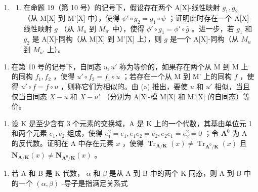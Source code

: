 \begin{enumerate}
\def\labelenumi{\arabic{enumi}.}
\setcounter{enumi}{25}
\tightlist
\item
  \begin{enumerate}
  \def\labelenumii{(\alph{enumii})}
  \tightlist
  \item
    在命题 19（第 10 号）的记号下，假设存在两个 A{[}X{]}-线性映射 \(g_1, g_2\) （从 M{[}X{]} 到 M'{[}X{]} 中），使得 \(\psi' \circ g_2 = g_1 \circ \psi\) ；证明此时存在一个 A{[}X{]}-线性映射 \(g\) （从 \(M_u\) 到 \(M_{u'}\) 中），使得 \(\phi' \circ g_1 = \phi' \circ \bar{g}\) 。进一步，若 \(g_1\) 和 \(g_2\) 是 A{[}X{]}-同构（从 M{[}X{]} 到 M'{[}X{]} 上），则 \(g\) 是一个 A{[}X{]}-同构（从 \(M_u\) 到 \(M_{u'}\) 上）。
  \end{enumerate}
\end{enumerate}

\begin{enumerate}
\def\labelenumi{(\alph{enumi})}
\setcounter{enumi}{1}
\tightlist
\item
  在第 10 号的记号下，自同态 \(u, u'\) 称为等价的，如果存在两个从 M 到 M 上的同构 \(f_1, f_2\) ，使得 \(u' \circ f_2 = f_1 \circ u\) ；若存在一个从 M 到 M' 上的同构 \(f\) ，使得 \(u' \circ f = f \circ u\) ，则称它们为相似的。由 (a) 推出，要使 \(u\) 和 \(u'\) 相似，当且仅当自同态 \(X - \bar{u}\) 和 \(X - \bar{u}'\) （分别为 A{[}X{]}-模 M{[}X{]} 和 M'{[}X{]} 的自同态）等价。
\end{enumerate}

\BourbakiExercisesSection

\begin{enumerate}
\def\labelenumi{\arabic{enumi}.}
\tightlist
\item
  设 K 是至少含有 3 个元素的交换域，A 是 K 上的一个代数，其基由单位元 1 和两个元素 \(e_1, e_2\) 组成，使得 \(e_1^2 = e_1, e_1e_2 = e_2, e_2e_1 = e_2^2 = 0\) ；令 \(\mathbf{A}^0\) 为 A 的反代数。证明在 A 中存在元素 \(x\) ，使得 \(\operatorname{Tr}_{\mathbf{A} / \mathbf{K}}(x) \neq \operatorname{Tr}_{\mathbf{A}^0 / \mathbf{K}}(x)\) 且 \(\mathbf{N}_{\mathbf{A} / \mathbf{K}}(x) \neq \mathbf{N}_{\mathbf{A}^0 / \mathbf{K}}(x)\) 。
\end{enumerate}

\BourbakiExercisesSection

\begin{enumerate}
\def\labelenumi{\arabic{enumi}.}
\tightlist
\item
  若 A 和 B 是 K-代数， \(\alpha\) 和 \(\beta\) 是从 A 到 B 中的两个 K-同态，则 A 到 B 中的一个 \((\alpha, \beta)\) -导子是指满足关系式
\end{enumerate}

